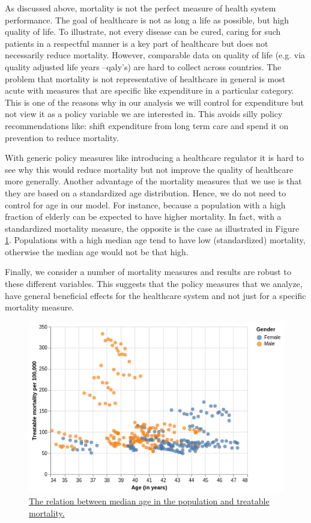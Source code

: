 \documentclass[a4paper,12pt]{article}
\begin{document}
As discussed above, mortality is not the perfect measure of health system performance. The goal of healthcare is not as long a life as possible, but high quality of life. To illustrate, not every disease can be cured, caring for such patients in a respectful manner is a key part of healthcare but does not necessarily reduce mortality. However, comparable data on quality of life (e.g. via quality adjusted life years --qaly's) are hard to collect across countries. The problem that mortality is not representative of healthcare in general is most acute with measures that are specific like expenditure in a particular category. This is one of the reasons why in our analysis we will control for expenditure but not view it as a policy variable we are interested in. This avoids silly policy recommendations like: shift expenditure from long term care and spend it on prevention to reduce mortality.

With generic policy measures like introducing a healthcare regulator it is hard to see why this would reduce mortality but not improve the quality of healthcare more generally. Another advantage of the mortality measures that we use is that they are based on a standardized age distribution. Hence, we do not need to control for age in our model. For instance, because a population with a high fraction of elderly can be expected to have higher mortality. In fact, with a standardized mortality measure, the opposite is the case as illustrated in Figure \ref{fig:age_mortality}. Populations with a high median age tend to have low (standardized) mortality, otherwise the median age would not be that high.

Finally, we consider a number of mortality measures and results are robust to these different variables. This suggests that the policy measures that we analyze, have general beneficial effects for the healthcare system and not just for a specific mortality measure.

\begin{figure}[htbp]
\centering
\includegraphics[width=.9\linewidth]{./figures/age_mortality.png}
\caption{\label{fig:age_mortality}\href{https://janboone.github.io/European-Healthcare-Systems/figures/age\_mortality.html}{The relation between median age in the population and treatable mortality.}}
\end{figure}
\end{document}
